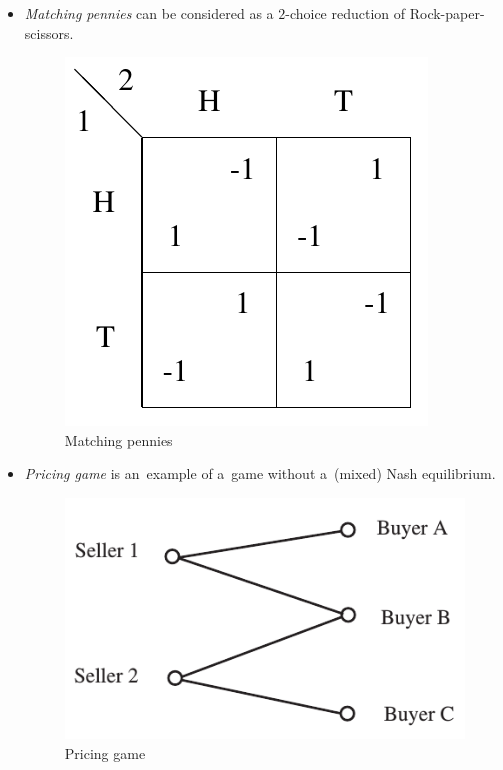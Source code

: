 \begin{itemize}
  \item \emph{Matching pennies} can be considered as a $2$-choice reduction of Rock-paper-scissors.

    \begin{figure}
      \centering
      \includegraphics[width=\widthratio\paperwidth]{../img/matching-pennies.png}
      \caption{Matching pennies}
      \label{fig:matching-pennies}
    \end{figure}

  \item \emph{Pricing game} is an~example of a~game without a~(mixed) Nash equilibrium.

    \begin{figure}
      \centering
      \includegraphics[width=\widthratio\paperwidth]{../img/pricing-game.png}
      \caption{Pricing game}
      \label{fig:pricing-game}
    \end{figure}


\end{itemize}

